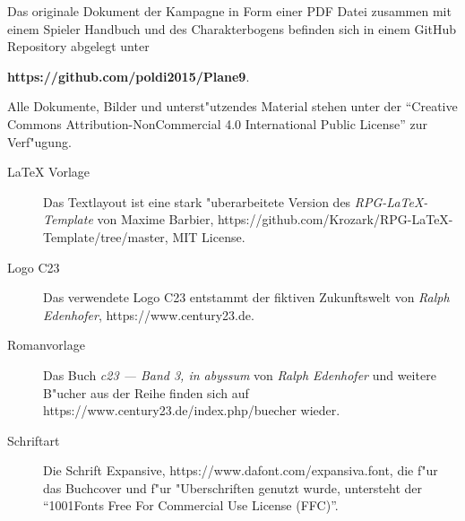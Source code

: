\newpage
\pagestyle{empty}



Das originale  Dokument der Kampagne in Form einer PDF Datei zusammen mit einem Spieler Handbuch und des Charakterbogens
befinden sich in einem GitHub Repository abgelegt unter 

\textbf{https://github.com/poldi2015/Plane9}. 

Alle Dokumente, Bilder und unterst"utzendes Material stehen unter der ``Creative Commons Attribution-NonCommercial 4.0 
International Public License'' zur Verf"ugung.


\begin{description}
    \item [LaTeX Vorlage] Das Textlayout ist eine stark "uberarbeitete Version des \textit{RPG-LaTeX-Template} von 
        Maxime Barbier, https://github.com/Krozark/RPG-LaTeX-Template/tree/master, MIT License.
    \item [Logo C23] Das verwendete Logo C23 entstammt der fiktiven Zukunftswelt von \emph{Ralph  Edenhofer}, 
        \newline{}https://www.century23.de.
    \item [Romanvorlage] Das Buch \emph{c23 --- Band 3, in abyssum} von \emph{Ralph Edenhofer} und weitere B"ucher aus der Reihe finden 
        sich auf https://www.century23.de/index.php/buecher wieder.
    \item [Schriftart] Die Schrift Expansive, https://www.dafont.com/expansiva.font, die f"ur das Buchcover und f"ur
        "Uberschriften genutzt wurde, untersteht der ``1001Fonts Free For Commercial Use License (FFC)''.
\end{description}